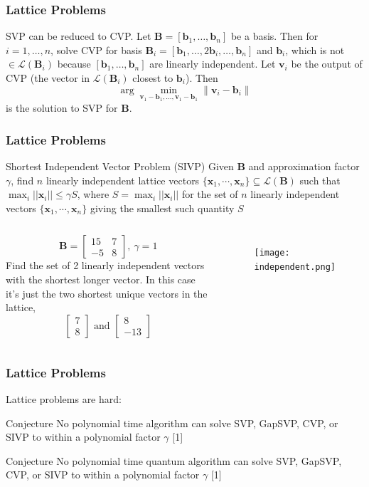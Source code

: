 \documentclass{beamer}
\renewcommand{\v}{\mathbf}
\begin{document}
\begin{frame}
\frametitle{Lattice Problems}
SVP can be reduced to CVP. Let $\v{B} = [\v{b}_1, \ldots, \v{b}_n]$
be a basis. Then for $i = 1,\ldots,n$, solve CVP for basis
$\v{B}_i=[\v{b}_1,\ldots,2\v{b}_i,\ldots,\v{b}_n]$ and $\v{b}_i$,
which is not $\in \mathcal{L}(\v{B}_i)$ because $[\v{b}_1, \ldots, \v{b}_n]$ are linearly independent. Let $\v{v}_i$ be the output of CVP (the vector in 
$\mathcal{L}(\v{B}_i)$ closest to $\v{b}_i$). Then
\[
    \arg\min_{\v{v}_1-\v{b}_1,\ldots,\v{v}_1-\v{b}_1}{\|\v{v}_i-\v{b}_i\|}
\]
is the solution to SVP for $\v{B}$.
\end{frame}
\begin{frame}
\frametitle{Lattice Problems}
\begin{block}{Shortest Independent Vector Problem (SIVP)}
    Given $\v{B}$ and approximation factor $\gamma$, find $n$ linearly 
    independent lattice vectors $\{\v{x}_1, \cdots, \v{x}_n\} \subseteq
    \mathcal{L}(\v{B})$ such that $\max_i{||\v{x}_i||} \leq \gamma S$,
    where $S = \max_i{||\v{x}_i||}$ for the set of $n$ linearly independent
    vectors $\{\v{x}_1,\cdots,\v{x}_n\}$ giving the smallest such quantity $S$ 
\end{block}
\begin{columns}
\[
    \v{B} = \begin{bmatrix}15 & 7 \\ -5 & 8 \end{bmatrix},\ 
    \gamma = 1
\]
Find the set of 2 linearly independent vectors with the shortest
longer vector. In this case it's just the two shortest unique
vectors in the lattice,
\[
    \begin{bmatrix} 7 \\ 8 \end{bmatrix}
    \text{ and }
    \begin{bmatrix} 8 \\ -13 \end{bmatrix}
\]
\begin{figure}
    \texttt{[image: independent.png]}
\end{figure}
\end{columns}
\end{frame}

\begin{frame}
\frametitle{Lattice Problems}
Lattice problems are hard:
\begin{block}{Conjecture}
    No polynomial time algorithm can solve SVP, GapSVP, CVP, or SIVP to within a polynomial factor $\gamma$ [1]
\end{block}
\begin{block}{Conjecture}
    No polynomial time quantum algorithm can solve SVP, GapSVP, CVP, or SIVP to within a polynomial factor $\gamma$ [1]
\end{block}
\end{frame}
\end{document}
